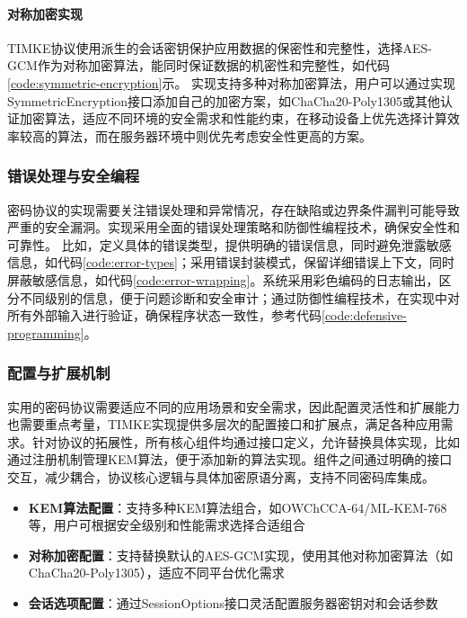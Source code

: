 \paragraph{对称加密实现}
TIMKE协议使用派生的会话密钥保护应用数据的保密性和完整性，选择AES-GCM作为对称加密算法，能同时保证数据的机密性和完整性，如代码\ref{code:symmetric-encryption}示。
实现支持多种对称加密算法，用户可以通过实现SymmetricEncryption接口添加自己的加密方案，如ChaCha20-Poly1305或其他认证加密算法，适应不同环境的安全需求和性能约束，在移动设备上优先选择计算效率较高的算法，而在服务器环境中则优先考虑安全性更高的方案。

\subsubsection{错误处理与安全编程}
\label{subsubsec:error_handling}

密码协议的实现需要关注错误处理和异常情况，存在缺陷或边界条件漏判可能导致严重的安全漏洞。实现采用全面的错误处理策略和防御性编程技术，确保安全性和可靠性。
比如，定义具体的错误类型，提供明确的错误信息，同时避免泄露敏感信息，如代码\ref{code:error-types}；采用错误封装模式，保留详细错误上下文，同时屏蔽敏感信息，如代码\ref{code:error-wrapping}。系统采用彩色编码的日志输出，区分不同级别的信息，便于问题诊断和安全审计；通过防御性编程技术，在实现中对所有外部输入进行验证，确保程序状态一致性，参考代码\ref{code:defensive-programming}。

\subsubsection{配置与扩展机制}
\label{subsubsec:configurability}
实用的密码协议需要适应不同的应用场景和安全需求，因此配置灵活性和扩展能力也需要重点考量，TIMKE实现提供多层次的配置接口和扩展点，满足各种应用需求。针对协议的拓展性，所有核心组件均通过接口定义，允许替换具体实现，比如通过注册机制管理KEM算法，便于添加新的算法实现。组件之间通过明确的接口交互，减少耦合，协议核心逻辑与具体加密原语分离，支持不同密码库集成。

\begin{itemize}
    \item \textbf{KEM算法配置}：支持多种KEM算法组合，如OWChCCA-64/ML-KEM-768等，用户可根据安全级别和性能需求选择合适组合
    
    \item \textbf{对称加密配置}：支持替换默认的AES-GCM实现，使用其他对称加密算法（如ChaCha20-Poly1305），适应不同平台优化需求
    
    \item \textbf{会话选项配置}：通过SessionOptions接口灵活配置服务器密钥对和会话参数
\end{itemize}

